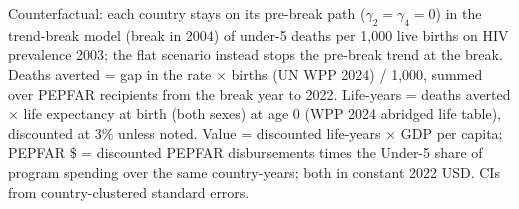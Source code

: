 \begin{table}[htbp]
\begin{minipage}{\textwidth}\footnotesize Counterfactual: each country stays on its pre-break path ($\gamma_2 = \gamma_4 = 0$) in the trend-break model (break in 2004) of under-5 deaths per 1,000 live births on HIV prevalence 2003; the flat scenario instead stops the pre-break trend at the break. Deaths averted = gap in the rate $\times$ births (UN WPP 2024) / 1,000, summed over PEPFAR recipients from the break year to 2022. Life-years = deaths averted $\times$ life expectancy at birth (both sexes) at age 0 (WPP 2024 abridged life table), discounted at 3\% unless noted. Value = discounted life-years $\times$ GDP per capita; PEPFAR \$ = discounted PEPFAR disbursements times the Under-5 share of program spending over the same country-years; both in constant 2022 USD. CIs from country-clustered standard errors.\end{minipage}
\end{table}
